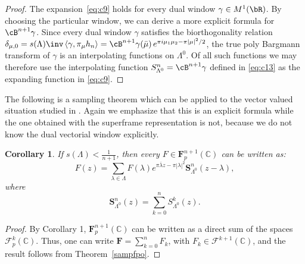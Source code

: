 \documentclass[12pt]{amsart}
\theoremstyle{plain}
\newtheorem{corollary}{Corollary}
\numberwithin{equation}{section}
\begin{document}
\begin{proof}
The expansion~\eqref{eq:c9} holds for every dual window $\gamma \in M^1(\bR )
$. By choosing the particular window, we can derive a more explicit formula
for $\cB ^{n+1}\gamma $. Since every dual window $\gamma $ satisfies the
biorthogonality relation $\delta _{\mu ,0} = s(\Lambda )\inv \,
\langle\gamma , \pi _\mu h_n\rangle = \cB ^{n+1}\gamma (\bar{\mu })\, e^{\pi
i \mu_1 \mu _2 -\pi |\mu |^2/2}$, the true poly Bargmann transform of $%
\gamma $ is an interpolating functions on $\Lambda ^0$. Of all such
functions we may therefore use the interpolating function $S_{\Lambda ^0}^n
= \cB ^{n+1} \gamma $ defined in \eqref{eq:c13} as the expanding function in %
\eqref{eq:c9}.%
\end{proof}

The following is a sampling theorem which can be applied to the vector
valued situation studied in \cite{CharlyYurasuper}. Again we emphasize that
this is an explicit formula while the one obtained with the superframe
representation is not, because we do not know the dual vectorial window
explicitly.

\begin{corollary}
If $s(\Lambda )<\frac{1}{n+1}$, then every $F\in \mathbf{F}_{p}^{n+1}(%
\mathbb{C}
)$ can be written as:%
\begin{equation*}
F(z)=\sum_{\lambda \in \Lambda }F(\lambda )e^{\pi \overline{\lambda }z-\pi
\left\vert \lambda \right\vert ^{2}}\mathbf{S}_{\Lambda ^{0}}^{n}(z-\lambda
),
\end{equation*}%
where%
\begin{equation*}
\mathbf{S}_{\Lambda ^{0}}^{n}(z)=\sum_{k=0}^{n}S_{\Lambda ^{0}}^{k}(z).
\end{equation*}
\end{corollary}

\begin{proof}
By Corollary 1, $\mathbf{F}_{p}^{n+1}(%
\mathbb{C}
)$ can be written as a direct sum of the spaces $\mathcal{F}_{p}^{k}(%
\mathbb{C}
)$. Thus, one can write $\mathbf{F}=\sum_{k=0}^{n}F_{k}$, with $F_{k}\in 
\mathcal{F}^{k+1}(%
\mathbb{C}
)$, and the result follows from Theorem~\ref{sampfpo}.
\end{proof}
\end{document}
